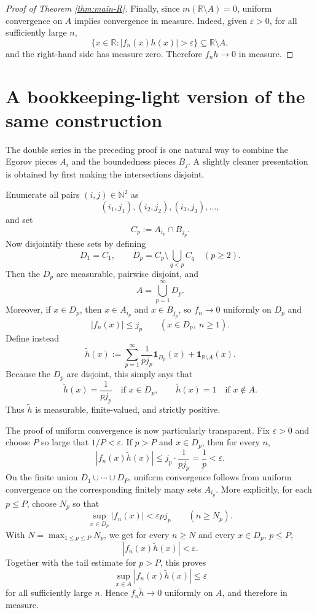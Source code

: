 \documentclass[11pt]{article}
\newcommand{\R}{\mathbb{R}}
\newcommand{\N}{\mathbb{N}}
\newcommand{\eps}{\varepsilon}
\newcommand{\one}{\mathbf 1}
\theoremstyle{plain}
\theoremstyle{definition}
\theoremstyle{remark}
\begin{document}
\begin{proof}[Proof of Theorem \ref{thm:main-R}]
Finally, since $m(\R\setminus A)=0$, uniform convergence on $A$ implies
convergence in measure.  Indeed, given $\eps>0$, for all sufficiently large
$n$,
\[
        \{x\in\R:|f_n(x)h(x)|>\eps\}
        \subseteq \R\setminus A,
\]
and the right-hand side has measure zero.  Therefore $f_nh\to 0$ in measure.
\end{proof}

\section{A bookkeeping-light version of the same construction}

The double series in the preceding proof is one natural way to combine the
Egorov pieces $A_i$ and the boundedness pieces $B_j$.  A slightly cleaner
presentation is obtained by first making the intersections disjoint.

Enumerate all pairs $(i,j)\in\N^2$ as
\[
        (i_1,j_1),(i_2,j_2),(i_3,j_3),\dots,
\]
and set
\[
        C_p:=A_{i_p}\cap B_{j_p}.
\]
Now disjointify these sets by defining
\[
        D_1=C_1,
        \qquad
        D_p=C_p\setminus \bigcup_{q<p}C_q
        \quad(p\geq 2).
\]
Then the $D_p$ are measurable, pairwise disjoint, and
\[
        A=\bigcup_{p=1}^\infty D_p.
\]
Moreover, if $x\in D_p$, then $x\in A_{i_p}$ and $x\in B_{j_p}$, so
$f_n\to 0$ uniformly on $D_p$ and
\[
        |f_n(x)|\leq j_p
        \qquad (x\in D_p,\ n\geq 1).
\]
Define instead
\[
        \widetilde h(x)
        :=
        \sum_{p=1}^\infty \frac{1}{p j_p}\one_{D_p}(x)
        +\one_{\R\setminus A}(x).
\]
Because the $D_p$ are disjoint, this simply says that
\[
        \widetilde h(x)=\frac{1}{p j_p}\quad\text{if }x\in D_p,
        \qquad
        \widetilde h(x)=1\quad\text{if }x\notin A.
\]
Thus $\widetilde h$ is measurable, finite-valued, and strictly positive.

The proof of uniform convergence is now particularly transparent.  Fix
$\eps>0$ and choose $P$ so large that $1/P<\eps$.  If $p>P$ and $x\in D_p$,
then for every $n$,
\[
        |f_n(x)\widetilde h(x)|
        \leq j_p\cdot \frac{1}{p j_p}
        =\frac{1}{p}
        <\eps.
\]
On the finite union $D_1\cup\cdots\cup D_P$, uniform convergence follows from
uniform convergence on the corresponding finitely many sets $A_{i_p}$.  More
explicitly, for each $p\leq P$, choose $N_p$ so that
\[
        \sup_{x\in D_p}|f_n(x)|<\eps p j_p
        \qquad(n\geq N_p).
\]
With $N=\max_{1\leq p\leq P}N_p$, we get for every $n\geq N$ and every
$x\in D_p$, $p\leq P$,
\[
        |f_n(x)\widetilde h(x)|
        <\eps.
\]
Together with the tail estimate for $p>P$, this proves
\[
        \sup_{x\in A}|f_n(x)\widetilde h(x)|\leq \eps
\]
for all sufficiently large $n$.  Hence $f_n\widetilde h\to 0$ uniformly on
$A$, and therefore in measure.
\end{document}
